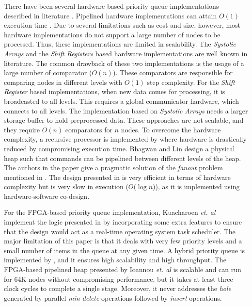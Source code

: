 \documentclass[10pt, conference, compsocconf]{IEEEtran}
\begin{document}
There have been several hardware-based priority queue implementations described in literature \cite{hw1,hw2,hw3,hw5,hw6,hw7,hw8,hw9}.
Pipelined hardware implementations can attain $O(1)$ execution time \cite{hw5,hw6}.
Due to several limitations such as cost and size, however, most hardware implementations do not support a large number of nodes to be processed.
Thus, these implementations are limited in scalability.
The {\it Systolic Arrays} and the {\it Shift Registers} \cite{hw8,hw9} based hardware implementations are well known in literature.
The common drawback of these two implementations is the usage of a large number of comparator ($O(n)$).
These comparators are responsible for comparing nodes in different levels with $O(1)$ step complexity.
For the {\it Shift Register} \cite{hw9} based implementations, when new data comes for processing, it is broadcasted to all levels.
This requires a global communicator hardware, which connects to all levels.
The implementation based on {\it Systolic Arrays} \cite{hw8} needs a larger storage buffer to hold preprocessed data.
These approaches are not scalable, and they require $O(n)$ comparators for $n$ nodes.
To overcome the hardware complexity, a recursive processor is implemented by \cite{hw10} where hardware is drastically reduced by compromising execution time.
Bhagwan and Lin \cite{hw2} design a physical heap such that commands can be pipelined between different levels of the heap.
The authors in the paper \cite{hw1} give a pragmatic solution of the {\it fanout} problem mentioned in \cite{hw3}.
The design presented in \cite{hw11} is very efficient in terms of hardware complexity but is very slow in execution ($O(\log n$)), as it is implemented using hardware-software co-design.

For the FPGA-based priority queue implementation, Kuacharoen {\it et. al} \cite{fpga3} implement the logic presented in \cite{hw3} by incorporating some extra features to ensure that the design would act as a real-time operating system task scheduler.
The major limitation of this paper is that it deals with very few priority levels and a small number of items in the queue at any given time.
A hybrid priority queue is implemented by \cite{fpga2}, and it ensures high scalability and high throughput.
The FPGA-based pipelined heap presented by Ioannou {\it et. al} \cite{fpga1} is scalable and can run for 64K nodes without compromising performance, but it takes at least three clock cycles to complete a single stage.
Moreover, it never addresses the {\it hole} generated by parallel {\it min-delete} operations followed by {\it insert} operations.
\end{document}
